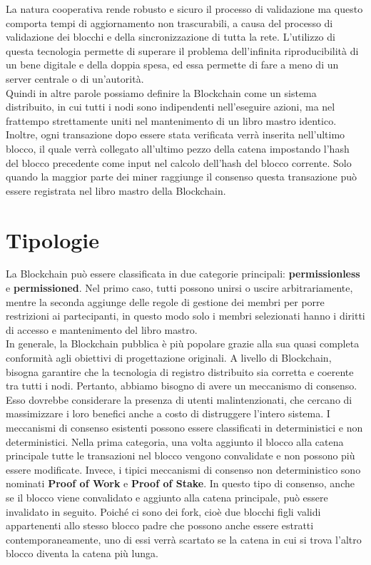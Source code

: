 \documentclass[a4paper,11pt]{report}
\begin{document}
\newpage
La natura cooperativa rende robusto e sicuro il processo di validazione ma questo comporta tempi di aggiornamento non trascurabili, a causa del processo di validazione dei blocchi e della sincronizzazione di tutta la rete. L'utilizzo di questa tecnologia permette di superare il problema dell'infinita riproducibilità di un bene digitale e della doppia spesa, ed essa permette di fare a meno di un server centrale o di un'autorità.\\
Quindi in altre parole possiamo definire la Blockchain come un sistema distribuito, in cui tutti i nodi sono indipendenti nell'eseguire azioni, ma nel frattempo strettamente uniti nel mantenimento di un libro mastro identico.\\
Inoltre, ogni transazione dopo essere stata verificata verrà inserita nell'ultimo blocco, il quale verrà collegato all'ultimo pezzo della catena impostando l'hash del blocco precedente come input nel calcolo dell'hash del blocco corrente. Solo quando la maggior parte dei miner raggiunge il consenso questa transazione può essere registrata nel libro mastro della Blockchain.\\ 
\newpage
\section{Tipologie}

La Blockchain può essere classificata in due categorie principali: \textbf{permissionless} e \textbf{permissioned}. Nel primo caso, tutti possono unirsi o uscire arbitrariamente, mentre la seconda aggiunge delle regole di gestione dei membri per porre restrizioni ai partecipanti, in questo modo solo i membri selezionati hanno i diritti di accesso e mantenimento del libro mastro. \\
In generale, la Blockchain pubblica è più popolare grazie alla sua quasi completa conformità agli obiettivi di progettazione originali.
A livello di Blockchain, bisogna garantire che la tecnologia di registro distribuito sia corretta e coerente tra tutti i nodi. Pertanto, abbiamo bisogno di avere un meccanismo di consenso. Esso dovrebbe considerare la presenza di utenti malintenzionati, che cercano di massimizzare i loro benefici anche a costo di distruggere l'intero sistema. I meccanismi di consenso esistenti possono essere classificati in deterministici e non deterministici. Nella prima categoria, una volta aggiunto il blocco alla catena principale tutte le transazioni nel blocco vengono convalidate e non possono più essere modificate. Invece, i tipici meccanismi di consenso non deterministico sono nominati \textbf{Proof of Work} e \textbf{Proof of Stake}. In questo tipo di consenso, anche se il blocco viene convalidato e aggiunto alla catena principale, può essere invalidato in seguito. Poiché ci sono dei fork, cioè due blocchi figli validi appartenenti allo stesso blocco padre che possono anche essere estratti contemporaneamente, uno di essi verrà scartato se la catena in cui si trova l'altro blocco diventa la catena più lunga.
\end{document}
